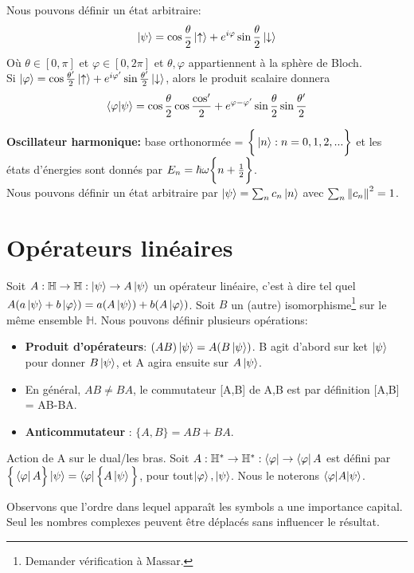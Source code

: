 \documentclass[../notesdecours.tex]{subfiles}
\begin{document}
Nous pouvons définir un état arbitraire:
\begin{equation}
\ket{\psi} = \cos\frac{\theta}{2} \ket{\uparrow}+e^{i\varphi}\sin\frac{\theta}{2}\ket{\downarrow}
\end{equation}
Où $\theta\in[0,\pi]$ et $\varphi \in [0,2\pi]$ et $\theta,\varphi$ appartiennent à la sphère de Bloch.\\

Si $\ket{\varphi} = \cos\frac{\theta'}{2}\ket{\uparrow}+e^{i\varphi'}\sin\frac{\theta'}{2}\ket{\downarrow}$, alors le produit scalaire donnera
\begin{equation}
\braket{\varphi|\psi} = \cos\frac{\theta}{2}\cos\frac{\cos'}{2}+e^{\varphi-\varphi'}\sin\frac{\theta}{2}\sin\frac{\theta'}{2}
\end{equation}

\textbf{Oscillateur harmonique:} base orthonormée = $\bigg\{\ket{n} : n=0,1,2,...\bigg\}$ et les états d'énergies sont donnés par $E_n = \hbar\omega\bigg\{n+\frac{1}{2}\bigg\}$.\\

Nous pouvons définir un état arbitraire par $\ket{\psi} = \sum_n c_n \ket{n}$ avec $\sum_n \norm{c_n}^2 = 1$.

\section{Opérateurs linéaires}
Soit $A : \mathbb{H} \rightarrow \mathbb{H} : \ket{\psi} \rightarrow A\ket{\psi}$ un opérateur linéaire, c'est à dire tel quel $A(a\ket{\psi}+b\ket{\varphi}) = a(A\ket{\psi})+b(A\ket{\varphi})$. Soit $B$ un (autre) isomorphisme\footnote{Demander vérification à Massar.} sur le même ensemble $\mathbb{H}$. Nous pouvons définir plusieurs opérations:
\begin{itemize}
\item \textbf{Produit d'opérateurs}: $(AB)\ket{\psi} = A(B\ket{\psi})$. B agit d'abord sur ket $\ket{\psi}$ pour donner $B\ket{\psi}$, et A agira ensuite sur $A\ket{\psi}$.
\item En général, $AB\neq BA$, le commutateur [A,B] de A,B est par définition [A,B] = AB-BA.
\item \textbf{Anticommutateur} : $\bigg\{A,B\bigg\} = AB+BA$.
\end{itemize}
Action de A sur le dual/les bras. Soit $A: \mathbb{H}^* \rightarrow \mathbb{H}^* : \bra{\varphi} \rightarrow \bra{\varphi}A$ est défini par $\Big\{\bra{\varphi}A\Big\}\ket{\psi} = \bra{\varphi}\Big\{A\ket{\psi}\Big\}$, pour tout$\ket{\varphi},\ket{\psi}$. Nous le noterons $\braket{\varphi|A|\psi}$.
\begin{remark} Observons que l'ordre dans lequel apparaît les symbols a une importance capital. Seul les nombres complexes peuvent être déplacés sans influencer le résultat. \end{remark}
\end{document}
